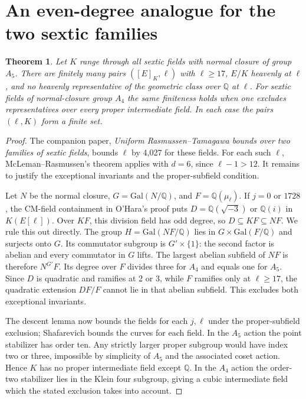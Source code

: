 \documentclass[11pt]{article}
\newtheorem{theorem}{Theorem}
\begin{document}
\section*{An even-degree analogue for the two sextic families}
\begin{theorem}
Let $K$ range through all sextic fields with normal closure of group
$A_5$. There are finitely many pairs $([E]_K,\ell)$ with $\ell\ge17$,
$E/K$ heavenly at $\ell$, and no heavenly representative of the geometric
class over $\mathbb Q$ at $\ell$. For sextic fields of normal-closure
group $A_4$ the same finiteness holds when one excludes representatives
over every proper intermediate field. In each case the pairs $(\ell,K)$
form a finite set.
\end{theorem}
\begin{proof}
The companion paper, \emph{Uniform Rasmussen--Tamagawa bounds over two
families of sextic fields}, bounds $\ell$ by 4,027 for these fields. For
each such $\ell$, McLeman--Rasmussen's theorem applies with $d=6$, since
$\ell-1>12$. It remains to justify the exceptional invariants and the
proper-subfield condition.

Let $N$ be the normal closure, $G=\mathrm{Gal}(N/\mathbb Q)$, and
$F=\mathbb Q(\mu_\ell)$. If $j=0$ or $1728$, the CM-field containment
in O'Hara's proof puts $D=\mathbb Q(\sqrt{-3})$ or $\mathbb Q(i)$ in
$K(E[\ell])$. Over $KF$, this division field has odd degree, so
$D\subseteq KF\subseteq NF$. We rule this out directly. The group
$H=\mathrm{Gal}(NF/\mathbb Q)$ lies in $G\times\mathrm{Gal}(F/\mathbb Q)$
and surjects onto $G$. Its commutator subgroup is $G'\times\{1\}$:
the second factor is abelian and every commutator in $G$ lifts.
The largest abelian subfield of $NF$ is therefore $N^{G'}F$.
Its degree over $F$ divides three for $A_4$ and equals one for $A_5$.
Since $D$ is quadratic and ramifies at 2 or 3, while $F$ ramifies only
at $\ell\ge17$, the quadratic extension $DF/F$ cannot lie in that
abelian subfield. This excludes both exceptional invariants.

The descent lemma now bounds the fields for each $j,\ell$ under the
proper-subfield exclusion; Shafarevich bounds the curves for each field.
In the $A_5$ action the point stabilizer has order ten. Any strictly
larger proper subgroup would have index two or three, impossible by
simplicity of $A_5$ and the associated coset action. Hence $K$ has no
proper intermediate field except $\mathbb Q$. In the $A_4$ action the
order-two stabilizer lies in the Klein four subgroup, giving a cubic
intermediate field which the stated exclusion takes into account.
\end{proof}
\end{document}
